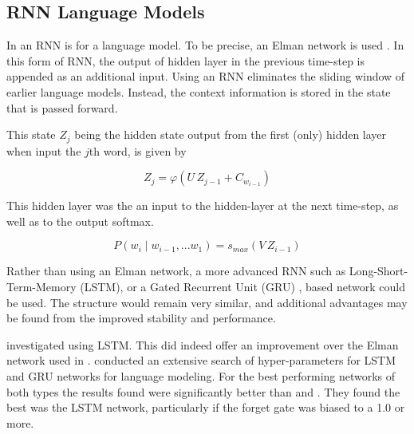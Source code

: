 \documentclass[parskip]{komatufte}
\begin{document}
\subsection{RNN Language Models}



In  an RNN is for a language model.
To be precise, an Elman network is used .
In this form of RNN, the output of hidden layer in the previous time-step is appended as an additional input.
Using an RNN eliminates the sliding window of earlier language models.
Instead, the context information is stored in the state that is passed forward.

This state $Z_{j}$ being the hidden state output from the first (only) hidden layer when input the $j$th word, 
is given by 

\begin{equation}
	Z_{j} = \varphi\left( U\,Z_{j-1} + C_{w_{i-1}} \right)
\end{equation}


This hidden layer was the an input to the hidden-layer at the next time-step, as well as to the output softmax.

\begin{equation}
	P(w_i \mid w_{i-1}, ... w_{1}) = s_{max}\left(V \, Z_{i-1} \right)
\end{equation}



Rather than using an Elman network, a more advanced RNN such as Long-Short-Term-Memory (LSTM), or a Gated Recurrent Unit (GRU) , based network could be used.
The structure would remain very similar,
and additional advantages may be found from the improved stability and performance.

 investigated using LSTM.
This did indeed offer an improvement over the Elman network used in \textcite{mikolov2010recurrent}.
 conducted an extensive search of hyper-parameters for LSTM and GRU networks for language modeling.
For the best performing networks of both types the results found were significantly better than \textcite{sundermeyer2012lstm} and \textcite{mikolov2010recurrent}.
They found the best was the LSTM network, particularly if the forget gate was biased to a 1.0 or more.
\end{document}
